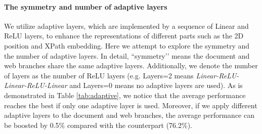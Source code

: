 \documentclass[11pt]{article}
\begin{document}
\paragraph{The symmetry and number of adaptive layers}
We utilize adaptive layers, which are implemented by a sequence of Linear and ReLU layers, to enhance the representations of different parts such as the 2D position and XPath embedding. Here we attempt to explore the symmetry and the number of adaptive layers. In detail, ``symmetry’’ means the document and web branches share the same adaptive layers. Additionally, we denote the number of layers as the number of ReLU layers (e.g. Layers=2 means \textit{Linear-ReLU-Linear-ReLU-Linear} and Layers=0 means no adaptive layers are used). As is demonstrated in Table \ref{tab:adaptive}, we notice that the average performance reaches the best if only one adaptive layer is used. Moreover, if we apply different adaptive layers to the document and web branches, the average performance can be boosted by 0.5\% compared with the counterpart (76.2\%).




\begin{table*}[t]
\centering
{}
\caption{Analysis of the parameter efficiency. XDoc shares most parameters across different formats, including word embedding, 1D position embedding, and Transformer layers. We omit some layers that contain negligible parameters such as segment embedding layers and LayerNorm layers. All the comparison models are in \textbf{base} size.}
\label{tab:parameters}
\end{table*}
\end{document}
